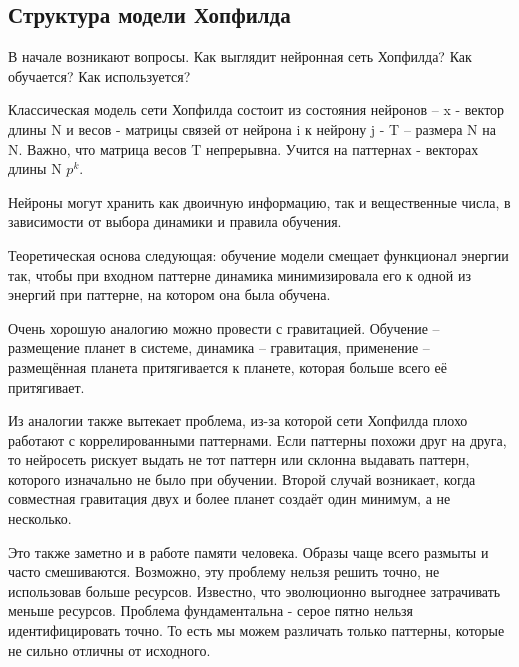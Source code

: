 
\subsection{\texorpdfstring{\textbf{
                  Структура модели Хопфилда}}
      {Структура модели Хопфилда}}

В начале возникают вопросы. Как выглядит нейронная сеть Хопфилда?
Как обучается? Как используется?

Классическая модель сети Хопфилда состоит из состояния нейронов -- x -
вектор длины N и весов - матрицы связей от нейрона i к нейрону j - T --
размера N на N. Важно, что матрица весов T непрерывна. Учится на
паттернах - векторах длины N \(p^{k}\).

Нейроны могут хранить как двоичную информацию, так и вещественные числа,
в зависимости от выбора динамики и правила обучения.

Теоретическая основа следующая: обучение модели смещает функционал
энергии так, чтобы при входном паттерне динамика минимизировала его к
одной из энергий при паттерне, на котором она была обучена.

Очень хорошую аналогию можно провести с гравитацией. Обучение --
размещение планет в системе, динамика -- гравитация, применение --
размещённая планета притягивается к планете, которая больше всего её
притягивает.

Из аналогии также вытекает проблема, из-за которой сети Хопфилда плохо
работают с коррелированными паттернами. Если паттерны похожи друг на
друга, то нейросеть рискует выдать не тот паттерн или склонна выдавать
паттерн, которого изначально не было при обучении. Второй случай
возникает, когда совместная гравитация двух и более планет создаёт один
минимум, а не несколько.

Это также заметно и в работе памяти человека. Образы чаще всего размыты
и часто смешиваются. Возможно, эту проблему нельзя решить точно, не
использовав больше ресурсов. Известно, что эволюционно выгоднее
затрачивать меньше ресурсов. Проблема фундаментальна - серое пятно нельзя
идентифицировать точно. То есть мы можем различать только паттерны, которые
не сильно отличны от исходного.
